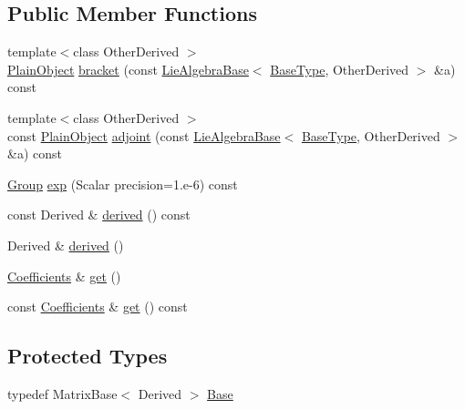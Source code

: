 \subsection*{Public Member Functions}
\begin{DoxyCompactItemize}
\item 
{\footnotesize template$<$class Other\+Derived $>$ }\\\hyperlink{class_lie_algebra_base_a360d9c7789cab342ccfc3bff779aba6e}{Plain\+Object} \hyperlink{class_lie_algebra_base_ab7969d13d46f11b7b769b9db48e67267}{bracket} (const \hyperlink{class_lie_algebra_base}{Lie\+Algebra\+Base}$<$ \hyperlink{class_lie_algebra_base_ae7884e2973ffa35f8b209b2831a066a1}{Base\+Type}, Other\+Derived $>$ \&a) const
\item 
{\footnotesize template$<$class Other\+Derived $>$ }\\const \hyperlink{class_lie_algebra_base_a360d9c7789cab342ccfc3bff779aba6e}{Plain\+Object} \hyperlink{class_lie_algebra_base_af1a16f8a8e2fdcb5c1529ffa3e7f2af9}{adjoint} (const \hyperlink{class_lie_algebra_base}{Lie\+Algebra\+Base}$<$ \hyperlink{class_lie_algebra_base_ae7884e2973ffa35f8b209b2831a066a1}{Base\+Type}, Other\+Derived $>$ \&a) const
\item 
\hyperlink{class_lie_algebra_base_aab4a5b7a728102ffe801534c0fc10d79}{Group} \hyperlink{class_lie_algebra_base_aafe7d43a29d43aed54dd91b3a3a4c9f7}{exp} (Scalar precision=1.e-\/6) const
\item 
const Derived \& \hyperlink{class_lie_algebra_base_a2d4fdcb29ba14871036418e90087b16e}{derived} () const
\item 
Derived \& \hyperlink{class_lie_algebra_base_aea14b5c74318541991d64eff30d8b1af}{derived} ()
\item 
\hyperlink{class_lie_algebra_base_a8e61a02d3c5f7a0b4bd87a4ccd47dc9a}{Coefficients} \& \hyperlink{class_lie_algebra_base_ae98f35321a261257a8aeee7d8388df2d}{get} ()
\item 
const \hyperlink{class_lie_algebra_base_a8e61a02d3c5f7a0b4bd87a4ccd47dc9a}{Coefficients} \& \hyperlink{class_lie_algebra_base_aa54c9478545ff1e222217a3bc19ec5d2}{get} () const
\end{DoxyCompactItemize}
\subsection*{Protected Types}
\begin{DoxyCompactItemize}
\item 
typedef Matrix\+Base$<$ Derived $>$ \hyperlink{class_lie_algebra_base_aa2d976fdcf8653f8a5a3f414e725a3e9}{Base}
\end{DoxyCompactItemize}


